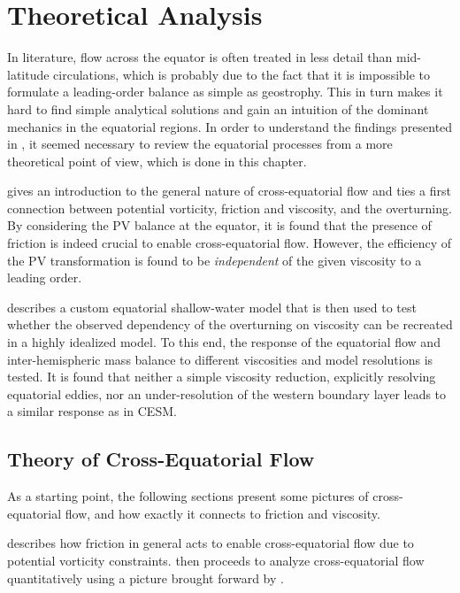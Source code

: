 \chapter{Theoretical Analysis}
\label{chap:analysis}
In literature, flow across the equator is often treated in less detail than mid-latitude circulations, which is probably due to the fact that it is impossible to formulate a leading-order balance as simple as geostrophy. This in turn makes it hard to find simple analytical solutions and gain an intuition of the dominant mechanics in the equatorial regions. In order to understand the findings presented in , it seemed necessary to review the equatorial processes from a more theoretical point of view, which is done in this chapter.

 gives an introduction to the general nature of cross-equatorial flow and ties a first connection between potential vorticity, friction and viscosity, and the overturning. By considering the \ac{PV} balance at the equator, it is found that the presence of friction is indeed crucial to enable cross-equatorial flow. However, the efficiency of the \ac{PV} transformation is found to be \emph{independent} of the given viscosity to a leading order.

 describes a custom equatorial shallow-water model that is then used to test whether the observed dependency of the overturning on viscosity can be recreated in a highly idealized model. To this end, the response of the equatorial flow and inter-hemispheric mass balance to different viscosities and model resolutions is tested. It is found that neither a simple viscosity reduction, explicitly resolving equatorial eddies, nor an under-resolution of the western boundary layer leads to a similar response as in \acs{CESM}.


\section{Theory of Cross-Equatorial Flow}
\label{sec:equatorial-theory}
As a starting point, the following sections present some pictures of cross-equatorial flow, and how exactly it connects to friction and viscosity.

 describes how friction in general acts to enable cross-equatorial flow due to potential vorticity constraints.  then proceeds to analyze cross-equatorial flow quantitatively using a picture brought forward by \citet{killworth}.

